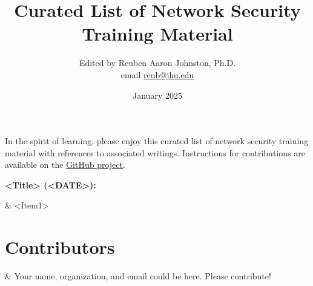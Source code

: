 \documentclass[a4paper]{article}
\title{Curated List of Network Security Training Material}
\author{Edited by Reuben Aaron Johnston, Ph.D. \\ email \href{mailto:reub@jhu.edu}{reub@jhu.edu}}
\date{January 2025}
\begin{document}
	\maketitle
	
	In the spirit of learning, please enjoy this curated list of network security training material with references to associated writings.  Instructions for contributions are available on the \href{https://github.com/reubenajohnston/CuratedCyberReads}{GitHub project}.
	
	\bigskip\noindent

	\noindent\textbf{<Title> (<DATE>):}
	\begin{easylist}[itemize]
	& <Item1>
  	\end{easylist}  

	\section*{Contributors}
 	\begin{easylist}[itemize]
  	& Your name, organization, and email could be here.  Please contribute!
	\end{easylist}
\end{document}
